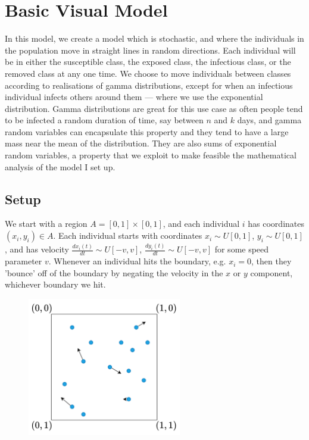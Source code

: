 \documentclass[11pt]{article}
\begin{document}
\section*{Basic Visual Model}
In this model, we create a model which is stochastic, and where the individuals in the population move in straight lines in random directions. Each individual will be in either the susceptible class, the exposed class, the infectious class, or the removed class at any one time. We choose to move individuals between classes according to realisations of gamma distributions, except for when an infectious individual infects others around them — where we use the exponential distribution. Gamma distributions are great for this use case as often people tend to be infected a random duration of time, say between $n$ and $k$ days, and gamma random variables can encapsulate this property and they tend to have a large mass near the mean of the distribution. They are also sums of exponential random variables, a property that we exploit to make feasible the mathematical analysis of the model I set up.

\subsection*{Setup}
We start with a region $A=[0,1]\times [0,1]$, and each individual $i$ has coordinates $(x_i, y_i)\in A$. Each individual starts with coordinates $x_i \sim U[0,1]$, $y_i \sim U[0,1]$, and has velocity $\frac{dx_i(t)}{dt} \sim U[-v,v]$, $\frac{dy_i(t)}{dt} \sim U[-v,v]$ for some speed parameter $v$. Whenever an individual hits the boundary, e.g. $x_i=0$, then they 'bounce' off of the boundary by negating the velocity in the $x$ or $y$ component, whichever boundary we hit.

\begin{figure}[H]
\label{BasicModelDiagram}
\begin{center}
\includegraphics[width=0.6\textwidth]{BasicModelDiagram1}
\end{center}
\end{figure}
\end{document}
